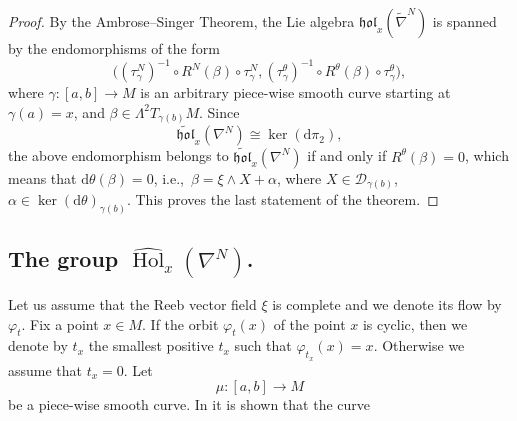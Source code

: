 \documentclass{amsart}
\theoremstyle{plain}
\theoremstyle{definition}
\newcommand{\Hol}{\operatorname{Hol}}
\newcommand{\pr}{\operatorname{pr}}
\newcommand{\hol}{\mathfrak{hol}}
\newcommand{\Real}{\mathbb{R}}
\newcommand{\1}{\mathbf{1}}
\newcommand{\D}{{\mathcal D}}
\renewcommand{\d}{\mathrm{d}}
\newcommand{\+}{\oplus}
\newcommand{\N}{N}
\newcommand{\tnab}{\widetilde{\nabla}}
\begin{document}
\begin{proof}
%
%
%
%

By the Ambrose--Singer Theorem, the Lie algebra  ${\hol}_x(\tnab^\N)$ is spanned by the endomorphisms of the form
$$\big((\tau^N_\gamma)^{-1}\circ R^N(\beta)\circ\tau^N_\gamma,(\tau^\theta_\gamma)^{-1}\circ R^\theta(\beta)\circ\tau^\theta_\gamma\big),$$
where $\gamma:[a,b]\to M$ is an arbitrary piece-wise smooth curve starting at $\gamma(a)=x$, and $\beta\in \Lambda^2T_{\gamma(b)}M$. Since 
$$\widetilde{\hol}_x(\nabla^N)\cong\ker (\d\pi_2),$$
the above endomorphism belongs to $\widetilde{\hol}_x(\nabla^N)$ if and only if $R^\theta(\beta)=0$, which means that $\d\theta(\beta)=0$, i.e.,~$\beta=\xi\wedge X+\alpha$, where $X\in \D_{\gamma(b)}$,  $\alpha\in\ker(\d\theta)_{\gamma(b)}$. This proves the last statement of the theorem. \end{proof}






\subsection{The group $\widehat{\Hol}_x(\nabla^N)$.} 
Let us assume that the Reeb vector field $\xi$ is complete 
and we denote its flow by $\varphi_t$. Fix a point $x\in M$. If the orbit $\varphi_t(x)$ of the point $x$ is cyclic, then we denote by $t_x$ the smallest positive $t_x$ such that $\varphi_{t_x}(x)=x$. Otherwise we assume that $t_x=0$.
Let $$\mu:[a,b]\to M$$ be  a piece-wise smooth curve. In \cite{GalHolK} it is shown that the  curve   
\end{document}
